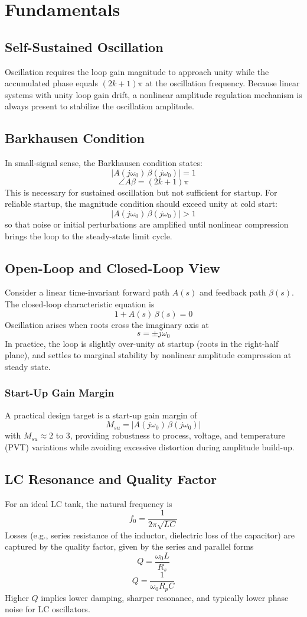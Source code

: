 \chapter{Fundamentals}
\section{Self-Sustained Oscillation}
Oscillation requires the loop gain magnitude to approach unity while the accumulated phase equals \((2k+1)\pi\) at the oscillation frequency. Because linear systems with unity loop gain drift, a nonlinear amplitude regulation mechanism is always present to stabilize the oscillation amplitude.

\section{Barkhausen Condition}
In small-signal sense, the Barkhausen condition states:
\[
|A(j\omega_0)\,\beta(j\omega_0)| = 1
\]
\[
\angle A\beta = (2k+1)\pi
\]
This is necessary for sustained oscillation but not sufficient for startup. For reliable startup, the magnitude condition should exceed unity at cold start:
\[
|A(j\omega_0)\,\beta(j\omega_0)| > 1
\]
so that noise or initial perturbations are amplified until nonlinear compression brings the loop to the steady-state limit cycle.

\section{Open-Loop and Closed-Loop View}
Consider a linear time-invariant forward path \(A(s)\) and feedback path \(\beta(s)\). The closed-loop characteristic equation is
\[
1 + A(s)\,\beta(s) = 0
\]
Oscillation arises when roots cross the imaginary axis at
\[
s = \pm j\omega_0
\]
In practice, the loop is slightly over-unity at startup (roots in the right-half plane), and settles to marginal stability by nonlinear amplitude compression at steady state.

\subsection*{Start-Up Gain Margin}
A practical design target is a start-up gain margin of
\[
M_{su} = |A(j\omega_0)\,\beta(j\omega_0)|
\]
with \(M_{su} \approx 2\) to 3, providing robustness to process, voltage, and temperature (PVT) variations while avoiding excessive distortion during amplitude build-up.

\section{LC Resonance and Quality Factor}
For an ideal LC tank, the natural frequency is
\[
f_0 = \frac{1}{2\pi\sqrt{LC}}
\]
Losses (e.g., series resistance of the inductor, dielectric loss of the capacitor) are captured by the quality factor, given by the series and parallel forms
\[
Q = \frac{\omega_0 L}{R_s}
\]
\[
Q = \frac{1}{\omega_0 R_p C}
\]
Higher \(Q\) implies lower damping, sharper resonance, and typically lower phase noise for LC oscillators.

